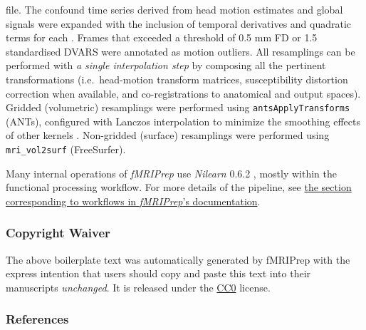 \documentclass[]{article}
\begin{document}
\begin{description}
file. The confound time series derived from head motion estimates and
global signals were expanded with the inclusion of temporal derivatives
and quadratic terms for each \citep{confounds_satterthwaite_2013}.
Frames that exceeded a threshold of 0.5 mm FD or 1.5 standardised DVARS
were annotated as motion outliers. All resamplings can be performed with
\emph{a single interpolation step} by composing all the pertinent
transformations (i.e.~head-motion transform matrices, susceptibility
distortion correction when available, and co-registrations to anatomical
and output spaces). Gridded (volumetric) resamplings were performed
using \texttt{antsApplyTransforms} (ANTs), configured with Lanczos
interpolation to minimize the smoothing effects of other kernels
\citep{lanczos}. Non-gridded (surface) resamplings were performed using
\texttt{mri\_vol2surf} (FreeSurfer).
\end{description}

Many internal operations of \emph{fMRIPrep} use \emph{Nilearn} 0.6.2
\citep[RRID:SCR\_001362]{nilearn}, mostly within the functional
processing workflow. For more details of the pipeline, see
\href{https://fmriprep.readthedocs.io/en/latest/workflows.html}{the
section corresponding to workflows in \emph{fMRIPrep}'s documentation}.

\hypertarget{copyright-waiver}{%
\subsubsection{Copyright Waiver}\label{copyright-waiver}}

The above boilerplate text was automatically generated by fMRIPrep with
the express intention that users should copy and paste this text into
their manuscripts \emph{unchanged}. It is released under the
\href{https://creativecommons.org/publicdomain/zero/1.0/}{CC0} license.

\hypertarget{references}{%
\subsubsection{References}\label{references}}


\end{document}
